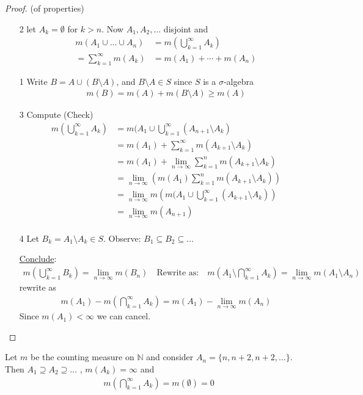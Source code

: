 \begin{proof}(of properties)
	\begin{enumerate}
		\item[2] let $A_k = \emptyset$ for $k >n$. Now $A_1, A_2, \ldots$ disjoint and 
			\begin{align*}
				m(A_1 \cup \ldots \cup A_n) &= m(\bigcup_{k=1}^{\infty} A_k ) \\ 
				= \sum_{k=1}^{\infty} m(A_k) &= m(A_1) + \cdots + m(A_n)
			\end{align*}
		\item[1] Write $B = A \cup (B \setminus A)$, and $B \setminus A \in S$ since $S$ is a $\sigma$-algebra
			\begin{align*}
				m(B) = m(A) + m(B \setminus A) \geq m(A)
			\end{align*} 
		\item[3] Compute (Check)
			\begin{align*}
				m(\bigcup_{k=1}^{\infty} A_k) &= m(A_1 \cup \bigcup_{k=1}^{\infty} (A_{n+1} \setminus A_k) \\
											  &= m(A_1) + \sum_{k=1}^{\infty} m(A_{k+1} \setminus A_k) \\
											  &= m(A_1) + \lim_{n \to \infty}  \sum_{k=1}^{n} m(A_{k+1} \setminus A_k) \\ 
											  &= \lim_{n \to \infty} \left(m(A_1) \sum_{k=1}^{n} m(A_{k+1} \setminus A_k) \right) \\ 
											  &= \lim_{n \to \infty} m \left(m(A_1 \cup \bigcup_{k=1}^{\infty} (A_{k+1} \setminus A_k) \right) \\ 
											  &= \lim_{n \to \infty} m (A_{n+1})  \\ 
			\end{align*} 
		\item[4] Let $B_k = A_1 \setminus A_k \in S$. Observe: $B_1 \subseteq B_2 \subseteq \ldots$

			\underline{Conclude}:
			\begin{align*}
				m(\bigcup_{k=1}^{\infty} B_k) = \lim_{n \to \infty} m(B_n) \quad \text{Rewrite as:} 
				\quad m(A_1 \setminus \bigcap_{k=1}^{\infty} A_k) = 
				\lim_{n \to \infty} m(A_1 \setminus A_n)
			\end{align*} rewrite as 
			\begin{align*}
				m(A_1) - m(\bigcap_{k=1}^{\infty} A_k) = m(A_1) - \lim_{n \to \infty} m(A_n)
			\end{align*} 
			Since $m(A_1) < \infty$ we can cancel.
	\end{enumerate}
\end{proof}

\begin{example}
	Let $m$ be the counting measure on  $\mathbb{N}$ and consider $A_n = \{n, n+2, n+2, \ldots \}$. 
	Then $A_1 \supseteq A_2 \supseteq \ldots$ , $m(A_k) = \infty$ and  
	\begin{align*}
		m(\bigcap_{k=1}^{\infty} A_k ) = m(\emptyset) = 0
	\end{align*} 
\end{example}

